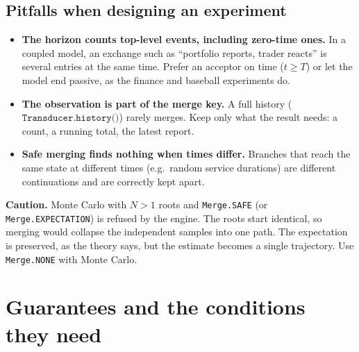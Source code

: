 \documentclass[11pt]{article}
\newcommand{\code}[1]{\texttt{#1}}
\newcommand{\warn}[1]{\par\noindent\colorbox{warnbg}{\parbox{\dimexpr\linewidth-2\fboxsep}{\small\textbf{Caution.} #1}}\par}
\begin{document}
\subsection{Pitfalls when designing an experiment}
\begin{itemize}
\item \textbf{The horizon counts top-level events, including zero-time ones.} In a coupled model, an exchange such as
  ``portfolio reports, trader reacts'' is several entries at the same time. Prefer an acceptor on time
  ($t\ge T$) or let the model end passive, as the finance and baseball experiments do.
\item \textbf{The observation is part of the merge key.} A full history ($\code{Transducer.history()}$) rarely
  merges. Keep only what the result needs: a count, a running total, the latest report.
\item \textbf{Safe merging finds nothing when times differ.} Branches that reach the same state at different times
  (e.g.\ random service durations) are different continuations and are correctly kept apart.
\end{itemize}
\warn{Monte Carlo with $N>1$ roots and \code{Merge.SAFE} (or \code{Merge.EXPECTATION}) is refused by the engine. The roots start identical, so merging
would collapse the independent samples into one path. The expectation is preserved, as the theory says, but the
estimate becomes a single trajectory. Use \code{Merge.NONE} with Monte Carlo.}

\section{Guarantees and the conditions they need}
\end{document}

